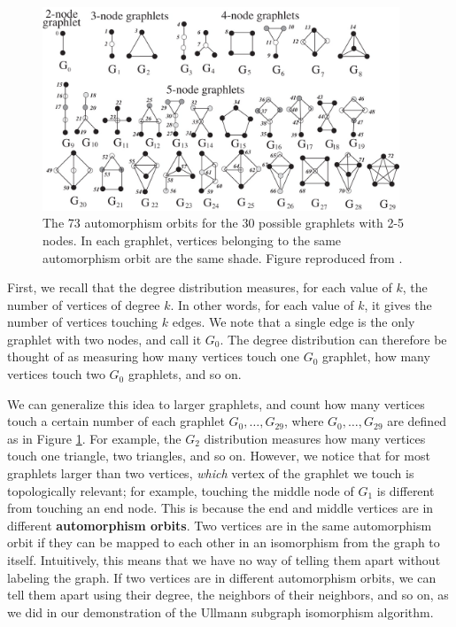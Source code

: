 \documentclass[12pt]{thesis}
\theoremstyle{plain}
\theoremstyle{definition}
\theoremstyle{remark}
\begin{document}
\begin{figure}[t]
\centering
\includegraphics[width=0.95\textwidth]{graphlets_figure.png}
\caption{The 73 automorphism orbits for the 30 possible graphlets with 2-5 nodes. In each graphlet, vertices belonging to the same automorphism orbit are the same shade. Figure reproduced from \cite{Przulj_2007}.}
\label{fig:graphlets}
\end{figure}

First, we recall that the degree distribution measures, for each value of $k$, the number of vertices of degree $k$. In other words, for each value of $k$, it gives the number of vertices touching $k$ edges. We note that a single edge is the only graphlet with two nodes, and call it $G_0$. The degree distribution can therefore be thought of as measuring how many vertices touch one $G_0$ graphlet, how many vertices touch two $G_0$ graphlets, and so on.

We can generalize this idea to larger graphlets, and count how many vertices touch a certain number of each graphlet $G_0, \dots, G_{29}$, where $G_0,\dots, G_{29}$ are defined as in Figure \ref{fig:graphlets}. For example, the $G_2$ distribution measures how many vertices touch one triangle, two triangles, and so on. However, we notice that for most graphlets larger than two vertices, \textit{which} vertex of the graphlet we touch is topologically relevant; for example, touching the middle node of $G_1$ is different from touching an end node. This is because the end and middle vertices are in different \textbf{automorphism orbits}. Two vertices are in the same automorphism orbit if they can be mapped to each other in an isomorphism from the graph to itself. Intuitively, this means that we have no way of telling them apart without labeling the graph. If two vertices are in different automorphism orbits, we can tell them apart using their degree, the neighbors of their neighbors, and so on, as we did in our demonstration of the Ullmann subgraph isomorphism algorithm.
\end{document}
